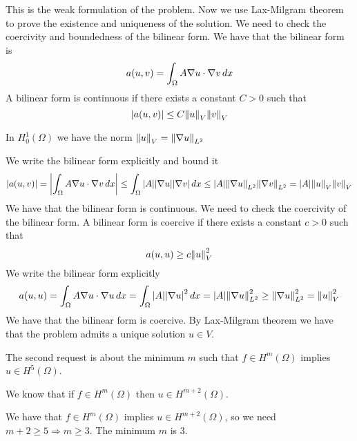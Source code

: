 This is the weak formulation of the problem. Now we use Lax-Milgram theorem to prove the existence and uniqueness of the solution. We need to check the coercivity and boundedness of the bilinear form. We have that the bilinear form is 
\[
    a(u, v) = \int_\Omega A \nabla u \cdot \nabla v \, dx
\]
A bilinear form is continuous if there exists a constant \(C > 0\) such that
\[
    \abs{a(u, v)} \leq C \norm{u}_V \norm{v}_V
\]
\begin{remark}
    In \(H^1_0(\Omega)\) we have the norm \(\norm{u}_V = \norm{\nabla u}_{L^2}\)
\end{remark}
We write the bilinear form explicitly and bound it
\[
    \begin{split}
        \abs{a(u, v)} = \abs{\int_\Omega A \nabla u \cdot \nabla v \, dx} \leq \int_\Omega \abs{A} \abs{\nabla u} \abs{\nabla v} \, dx \leq \abs{A} \norm{\nabla u}_{L^2} \norm{\nabla v}_{L^2} = \abs{A} \norm{u}_V \norm{v}_V
    \end{split}
\]
We have that the bilinear form is continuous. We need to check the coercivity of the bilinear form. A bilinear form is coercive if there exists a constant \(c > 0\) such that
\[
    a(u, u) \geq c \norm{u}_V^2
\]
We write the bilinear form explicitly 
\[
    \begin{split}
        a(u, u) = \int_\Omega A \nabla u \cdot \nabla u \, dx = \int_\Omega \abs{A} \abs{\nabla u}^2 \, dx = \abs{A} \norm{\nabla u}_{L^2}^2 \geq \norm{\nabla u}_{L^2}^2 = \norm{u}_V^2
    \end{split}
\]
We have that the bilinear form is coercive. By Lax-Milgram theorem we have that the problem admits a unique solution \(u \in V\).

The second request is about the minimum \(m\) such that \(f \in H^m(\Omega)\) implies \(u \in H^5(\Omega)\). 
\begin{remark}
    We know that if \(f \in H^m(\Omega)\) then \(u \in H^{m+2}(\Omega)\).
\end{remark}
We have that \(f \in H^m(\Omega)\) implies \(u \in H^{m+2}(\Omega)\), so we need \(m+2 \geq 5 \Rightarrow m \geq 3\). The minimum \(m\) is 3.

